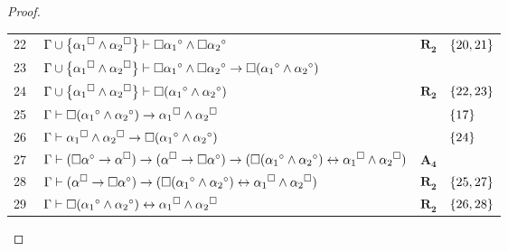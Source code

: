 \begin{tcolorbox}[enhanced jigsaw, breakable, sharp corners, colframe=black, colback=white, boxrule=0.5pt, left=1.5mm, right=1.5mm, top=1.5mm, bottom=1.5mm]
\begin{theorem}
\begin{proof}
\begin{xltabular}{\textwidth}{r | X l l}
            \scriptsize{22}\phantom{ }           & $\ \Gamma\cup\set{{\alpha_1}^\medsquare\wedge{\alpha_2}^\medsquare} \vdash \nec{\alpha_1}^\circ \wedge \nec{\alpha_2}^\circ$                                                                                                  & $\hyperref[modal.rule.2]{\mathbf{R_2}}$ & $\left\{20,21\right\}$\\[\rowskip]
            \scriptsize{23}\phantom{ }           & $\ \Gamma\cup\set{{\alpha_1}^\medsquare\wedge{\alpha_2}^\medsquare} \vdash \nec{\alpha_1}^\circ \wedge \nec{\alpha_2}^\circ \to \nec({\alpha_1}^\circ \wedge {\alpha_2}^\circ)$                                               &  & \\[\rowskip]
            \scriptsize{24}\phantom{ }           & $\ \Gamma\cup\set{{\alpha_1}^\medsquare\wedge{\alpha_2}^\medsquare} \vdash \nec({\alpha_1}^\circ \wedge {\alpha_2}^\circ)$                                                                                                    & $\hyperref[modal.rule.2]{\mathbf{R_2}}$ & $\left\{22,23\right\}$\\[\rowskip]
            \scriptsize{25}\phantom{ }           & $\ \Gamma\vdash\nec({\alpha_1}^\circ \wedge {\alpha_2}^\circ) \to {\alpha_1}^\medsquare \wedge {\alpha_2}^\medsquare$                                                                                                         &  & $\left\{17\right\}$\\[\rowskip]
            \scriptsize{26}\phantom{ }           & $\ \Gamma\vdash{\alpha_1}^\medsquare \wedge {\alpha_2}^\medsquare \to \nec({\alpha_1}^\circ \wedge {\alpha_2}^\circ)$                                                                                                         &  & $\left\{24\right\}$\\[\rowskip]
            \scriptsize{27}\phantom{ }           & $\ \Gamma\vdash(\nec\alpha^\circ \to \alpha^\medsquare) \to (\alpha^\medsquare \to \nec\alpha^\circ) \to (\nec({\alpha_1}^\circ \wedge {\alpha_2}^\circ) \leftrightarrow {\alpha_1}^\medsquare \wedge {\alpha_2}^\medsquare)$ & $\hyperref[modal.axiom.4]{\mathbf{A_4}}$ & \\[\rowskip]
            \scriptsize{28}\phantom{ }           & $\ \Gamma\vdash(\alpha^\medsquare \to \nec\alpha^\circ) \to (\nec({\alpha_1}^\circ \wedge {\alpha_2}^\circ) \leftrightarrow {\alpha_1}^\medsquare \wedge {\alpha_2}^\medsquare)$                                              & $\hyperref[modal.rule.2]{\mathbf{R_2}}$ & $\left\{25,27\right\}$\\[\rowskip]
            \scriptsize{29}\phantom{ }           & $\ \Gamma\vdash\nec({\alpha_1}^\circ \wedge {\alpha_2}^\circ) \leftrightarrow {\alpha_1}^\medsquare \wedge {\alpha_2}^\medsquare$                                                                                             & $\hyperref[modal.rule.2]{\mathbf{R_2}}$ & $\left\{26,28\right\}$
        \end{xltabular}
        \normalsize


\end{proof}
\end{theorem}
\end{tcolorbox}
